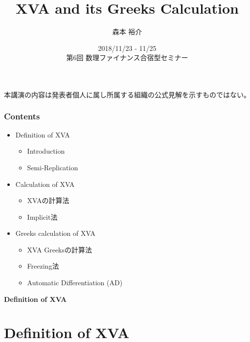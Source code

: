 \documentclass[driverfallback=dvipdfmx,cjk]{beamer}
\title{XVA and its Greeks Calculation}
\author{森本 裕介}
\institute{三菱UFJ銀行}
\date{2018/11/23 - 11/25 \\ 第6回 数理ファイナンス合宿型セミナー}
\begin{document}
\begin{frame}
\titlepage
本講演の内容は発表者個人に属し所属する組織の公式見解を示すものではない。
\end{frame}


\begin{frame}\frametitle{Contents}
    \begin{itemize}
        \item Definition of XVA
        \begin{itemize}
            \item Introduction
            \item Semi-Replication
        \end{itemize}
        \item Calculation of XVA
        \begin{itemize}
           \item XVAの計算法
           \item Implicit法 
        \end{itemize}
        \item Greeks calculation of XVA
        \begin{itemize}
           \item XVA Greeksの計算法
           \item Freezing法
           \item Automatic Differentiation (AD)
        \end{itemize}
    \end{itemize}
\end{frame}

\begin{frame}
    \textbf{Definition of XVA}
\end{frame}

\section{Definition of XVA}
\end{document}
